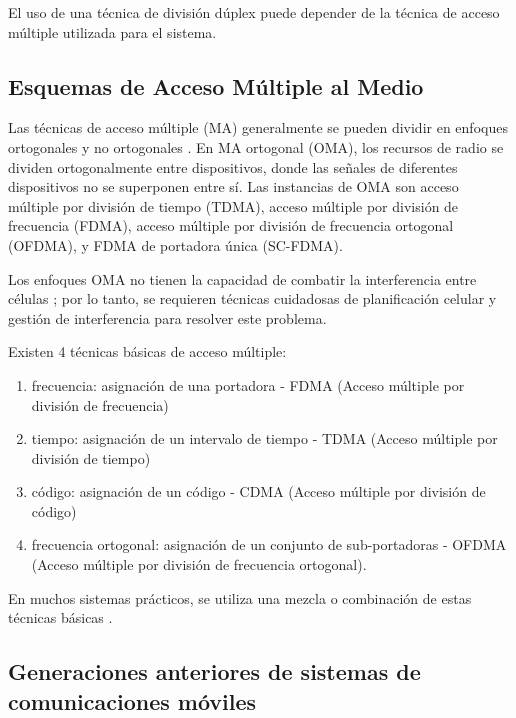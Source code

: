 El uso de una técnica de división dúplex puede depender de la técnica de acceso múltiple utilizada para el sistema.

\subsection{Esquemas de Acceso Múltiple al Medio}
Las técnicas de acceso múltiple (MA) generalmente se pueden dividir en enfoques ortogonales y no ortogonales \parencite{Tse2004}. En MA ortogonal (OMA), los recursos de radio se dividen ortogonalmente entre dispositivos, donde las señales de diferentes dispositivos no se superponen entre sí. Las instancias de OMA son acceso múltiple por división de tiempo (TDMA), acceso múltiple por división de frecuencia (FDMA), acceso múltiple por división de frecuencia ortogonal (OFDMA), y FDMA de portadora única (SC-FDMA).\newline

Los enfoques OMA no tienen la capacidad de combatir la interferencia entre células \parencite{Shirvanimoghaddam2017}; por lo tanto, se requieren técnicas cuidadosas de planificación celular y gestión de interferencia para resolver este problema. \newline

Existen 4 técnicas básicas de acceso múltiple:

\begin{enumerate}
\item  frecuencia: asignación de una portadora - FDMA (Acceso múltiple por división de frecuencia)
\item  tiempo: asignación de un intervalo de tiempo - TDMA (Acceso múltiple por división de tiempo)
\item  código: asignación de un código - CDMA (Acceso múltiple por división de código)
\item   frecuencia ortogonal: asignación de un conjunto de sub-portadoras - OFDMA (Acceso múltiple por división de frecuencia ortogonal).
\end{enumerate}

 En muchos sistemas prácticos, se utiliza una mezcla o combinación de estas técnicas básicas \parencite{Correia2018}.\newline

\subsection{Generaciones anteriores de sistemas de comunicaciones móviles}

